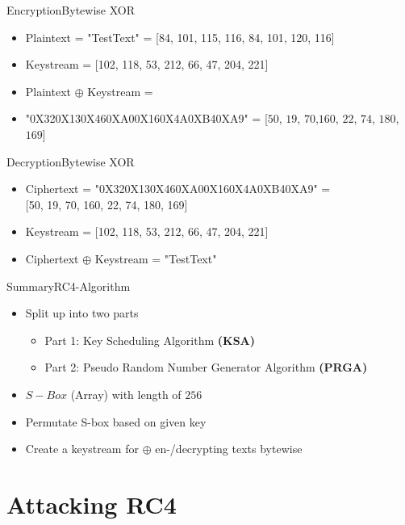 \documentclass[
	aspectratio=169,	%
	onlytextwidth,		%
	t					%
	]{beamer}
\begin{document}
\begin{frame}[fragile]{Encryption}{Bytewise XOR}
	\small
	\begin{itemize}[<+->]
		\item Plaintext = "TestText" = {\color{purple}[84, 101, 115, 116, 84, 101, 120, 116]}
		\item Keystream = {\color{olive}[102, 118, 53, 212, 66, 47, 204, 221]}
		\item Plaintext $\oplus$ Keystream =
		\item "0X320X130X460XA00X160X4A0XB40XA9" = [$50$, $19$, $70$,$160$, $22$, $74$, $180$, $169$]
	\end{itemize}
	\normalsize
\end{frame}

\begin{frame}[fragile]{Decryption}{Bytewise XOR}
	\small
	\begin{itemize}[<+->]
		\item Ciphertext = "0X320X130X460XA00X160X4A0XB40XA9" = \\{\color{purple}[50, 19, 70, 160, 22, 74, 180, 169]}
		\item Keystream = {\color{olive}[102, 118, 53, 212, 66, 47, 204, 221]} 
		\item Ciphertext $\oplus$ Keystream = "TestText"
	\end{itemize}
	\normalsize
\end{frame}

\begin{frame}[fragile]{Summary}{RC4-Algorithm}
	\begin{itemize}[<+->]
		\item Split up into two parts
		\begin{itemize}
			\item Part 1: Key Scheduling Algorithm \textbf{(KSA)}
			\item Part 2: Pseudo Random Number Generator Algorithm \textbf{(PRGA)}
		\end{itemize}
		\item $S-Box$ (Array) with length of $256$
		\item Permutate S-box based on given key
		\item Create a keystream for $\oplus$ en-/decrypting texts bytewise
	\end{itemize}
\end{frame}

\section{Attacking RC4}
\end{document}
